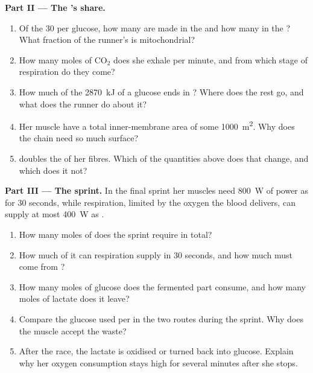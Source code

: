 \begin{problem}
\medskip
\noindent\textbf{Part II --- The 's share.}
\begin{enumerate}[resume]
  \item Of the 30  per glucose, how many are made in the 
        and how many in the ? What fraction of the
        runner's  is mitochondrial?
  \item How many moles of $\mathrm{CO_2}$ does she exhale per minute,
        and from which stage of respiration do they come?
  \item How much of the \qty{2870}{kJ} of a glucose ends in ? Where
        does the rest go, and what does the runner do about it?
  \item Her muscle  have a total inner-membrane area of
        some \qty{1000}{m^2}. Why does the chain need so much surface?
  \item {} doubles the  of her fibres. Which of the
        quantities above does that change, and which does it not?
\end{enumerate}

\medskip
\noindent\textbf{Part III --- The sprint.}
In the final sprint her muscles need \qty{800}{W} of power as  for
30 seconds, while respiration, limited by the oxygen the blood
delivers, can supply at most \qty{400}{W} as .
\begin{enumerate}[resume]
  \item How many moles of  does the sprint require in total?
  \item How much of it can respiration supply in 30 seconds, and how
        much must come from ?
  \item How many moles of glucose does the fermented part consume, and
        how many moles of lactate does it leave?
  \item Compare the glucose used per  in the two routes during the
        sprint. Why does the muscle accept the waste?
  \item After the race, the lactate is oxidised or turned back into
        glucose. Explain why her oxygen consumption stays high for
        several minutes after she stops.
\end{enumerate}


\end{problem}
